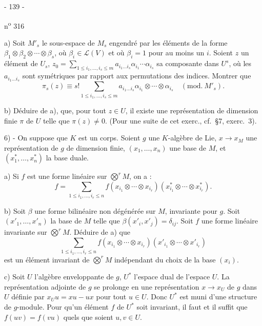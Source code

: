 \begin{center}- 139 -\end{center}
\hfill n\textsuperscript{o} 316

a) Soit $M'_s$ le sous-espace de $M_s$ engendré par les éléments de la forme $\beta_1\otimes\beta_2\otimes\cdots\otimes\beta_s$, où $\beta_i\in\mathcal L(V)$ et où $\beta_i=1$ pour au moins un $i$. Soient $z$ un élément de $U_s$, $z_0=\sum_{1\leq i_1,\ldots,i_s\leq m}a_{i_1\ldots i_s}\alpha_{i_1}\cdots\alpha_{i_s}$ sa composante dans $U^s$, où les $a_{i_1\ldots i_s}$ sont symétriques par rapport aux permutations des indices. Montrer que
\[
\pi_s(z)\equiv s!\sum_{1\leq i_1,\ldots,i_s\leq m}a_{i_1\ldots i_s}\alpha_{i_1}\otimes\cdots\otimes\alpha_{i_s}\quad(\mathrm{mod.}\ M'_s).
\]

b) Déduire de a), que, pour tout $z\in U$, il existe une représentation de dimension finie $\pi$ de $U$ telle que $\pi(z)\neq0$. (Pour une suite de cet exerc., cf.\ §7, exerc.\ 3).

6) - On suppose que $K$ est un corps. Soient $g$ une $K$-algèbre de Lie, $x\longrightarrow x_M$ une représentation de $g$ de dimension finie, $(x_1,\ldots,x_n)$ une base de $M$, et $(x_1^*,\ldots,x_n^*)$ la base duale.

a) Si $f$ est une forme linéaire sur $\overset{r}{\bigotimes}M$, on a :
\[
f=\sum_{1\leq i_1,\ldots,i_r\leq n}f(x_{i_1}\otimes\cdots\otimes x_{i_r})(x_{i_1}^*\otimes\cdots\otimes x_{i_r}^*).
\]

b) Soit $\beta$ une forme bilinéaire non dégénérée sur $M$, invariante pour $g$. Soit $(x'_1,\ldots,x'_n)$ la base de $M$ telle que $\beta(x'_i,x'_j)=\delta_{ij}$. Soit $f$ une forme linéaire invariante sur $\overset{r}{\bigotimes}M$. Déduire de a) que
\[
\sum_{1\leq i_1,\ldots,i_r\leq n}f(x_{i_1}\otimes\cdots\otimes x_{i_r})(x'_{i_1}\otimes\cdots\otimes x'_{i_r})
\]
est un élément invariant de $\overset{r}{\bigotimes}M$ indépendant du choix de la base $(x_i)$.

c) Soit $U$ l'algèbre enveloppante de $g$, $U^*$ l'espace dual de l'espace $U$. La représentation adjointe de $g$ se prolonge en une représentation $x\longrightarrow x_U$ de $g$ dans $U$ définie par $x_Uu=xu-ux$ pour tout $u\in U$. Donc $U^*$ est muni d'une structure de $g$-module. Pour qu'un élément $f$ de $U^*$ soit invariant, il faut et il suffit que $f(uv)=f(vu)$ quels que soient $u,v\in U$.
